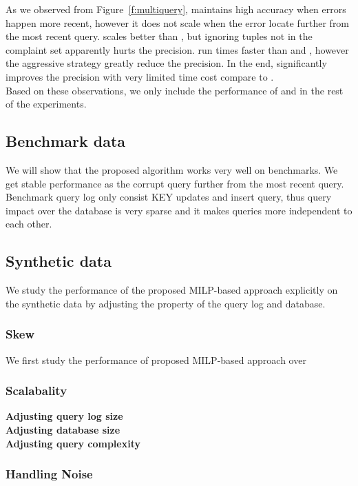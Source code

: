 {As we observed from Figure~\ref{f:multiquery}, \milpall maintains high accuracy when errors
happen more recent, however it does not scale when the error locate further from the most
recent query. \milptuple scales better than \milpall, but ignoring tuples not 
in the complaint set apparently hurts the precision. \milptuplestopearly run times faster
than \milpall and \milptuple, however the aggressive strategy greatly reduce the 
precision. In the end, \milpadvtuple significantly improves the precision with very limited
time cost compare to \milptuple. \\
Based on these observations, we only include the performance of \milpadvtuple and \milpadvall
in the rest of the experiments.

\subsection{Benchmark data}
We will show that the proposed algorithm works very well on benchmarks. We get stable
performance as the corrupt query further from the most recent query. Benchmark query log
only consist KEY updates and insert query, thus query impact over the database is 
very sparse and it makes queries more independent to each other. 

\subsection{Synthetic data}
We study the performance of the proposed MILP-based approach explicitly on the synthetic data 
by adjusting the property of the query log and database. 
\subsubsection{Skew}
We first study the performance of proposed MILP-based approach over 


\subsubsection{Scalabality}
\textbf{Adjusting query log size}\\

\textbf{Adjusting database size} \\

\textbf{Adjusting query complexity} \\

}
\subsubsection{Handling Noise}

